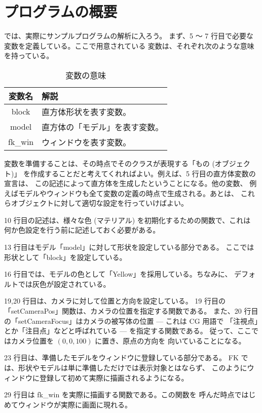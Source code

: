 \section{プログラムの概要}
では、実際にサンプルプログラムの解析に入ろう。
まず、5 〜 7 行目で必要な変数を定義している。ここで用意されている
変数は、それぞれ次のような意味を持っている。
\begin{table}[H]
\caption{変数の意味}
\label{tbl:samp1}
\begin{center}
\begin{tabular}{|c|l|}
\hline
変数名 & 解説 \\ \hline \hline
block & 直方体形状を表す変数。\\ \hline
model & 直方体の「モデル」を表す変数。\\ \hline
fk\_win & ウィンドウを表す変数。\\ \hline
\end{tabular}
\end{center}
\end{table}

変数を準備することは、その時点でそのクラスが表現する「もの (オブジェクト)」
を作成することだと考えてくれればよい。例えば、5 行目の直方体変数の宣言は、
この記述によって直方体を生成したということになる。他の変数、
例えばモデルやウィンドウも全て変数の定義の時点で生成される。あとは、
これらオブジェクトに対して適切な設定を行っていけばよい。

10 行目の記述は、様々な色 (マテリアル) を初期化するための関数で、これは
何か色設定を行う前に記述しておく必要がある。

13 行目はモデル「model」に対して形状を設定している部分である。
ここでは形状として「block」を設定している。

16 行目では、モデルの色として「Yellow」を採用している。ちなみに、
デフォルトでは灰色が設定されている。

19,20 行目は、カメラに対して位置と方向を設定している。
19 行目の「setCameraPos」関数は、カメラの位置を指定する関数である。
また、20 行目の「setCameraFocus」はカメラの被写体の位置 --- これは CG 用語で
「注視点」とか「注目点」などと呼ばれている --- を指定する関数である。
従って、ここではカメラ位置を \((0, 0, 100)\) に置き、原点の方向を
向いていることになる。

23 行目は、準備したモデルをウィンドウに登録している部分である。
FK では、形状やモデルは単に準備しただけでは表示対象とはならず、
このようにウィンドウに登録して初めて実際に描画されるようになる。

29 行目は fk\_win を実際に描画する関数である。この関数を
呼んだ時点ではじめてウィンドウが実際に画面に現れる。

